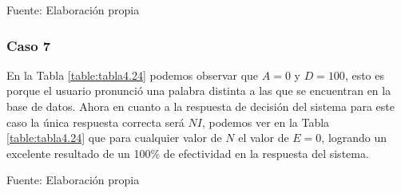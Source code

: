 \begin{center}
\begin{table}[H]
\centering
\caption{\small{Resultados para el caso 6 con U1 dinámico.}}
\label{table:tabla4.23}
\vskip 0.2cm
\begin{center}
\vskip 0.2cm
{\small{Fuente: Elaboración propia}}
\end{center}
\end{table}
\end{center}

\subsubsection{Caso 7}
En la Tabla \ref{table:tabla4.24} podemos observar que $A = 0$ y $D = 100$, esto es porque el usuario pronunció una palabra distinta a las que se encuentran en la base de datos.
\vskip 0.5cm
Ahora en cuanto a la respuesta de decisión del sistema para este caso la única respuesta correcta será $NI$, podemos ver en la Tabla \ref{table:tabla4.24} que para cualquier valor de $N$ el valor de $E = 0$, logrando un excelente resultado de un 100\% de efectividad en la respuesta del sistema.

\begin{center}
\begin{table}[H]
\centering
\caption{\small{Resultados para el caso 7 con U1 dinámico.}}
\label{table:tabla4.24}
\vskip 0.2cm
\begin{center}
\vskip 0.2cm
{\small{Fuente: Elaboración propia}}
\end{center}
\end{table}
\end{center}

